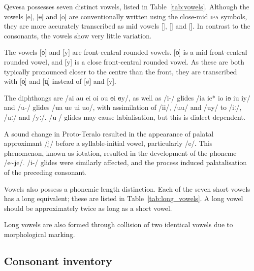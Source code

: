 \documentclass[grammar]{subfiles}
\begin{document}
  Qevesa possesses seven distinct vowels, listed in Table~\ref{tab:vowels}. Although the vowels [e], [ɵ] and [o] are conventionally written using the close-mid \textsc{ipa} symbols, they are more accurately transcribed as mid vowels [], [] and []. In contrast to the consonants, the vowels show very little variation.

  The vowels [ɵ] and [y] are front-central rounded vowels. [ɵ] is a mid front-central rounded vowel, and [y] is a close front-central rounded vowel. As these are both typically pronounced closer to the centre than the front, they are transcribed with [ɵ̟] and [ʉ̟] instead of [ø] and [y].

  The diphthongs are /ai au ei oi ou ɵi ɵy/, as well as /i-/ glides /ia ie* io iɵ iu iy/ and /u-/ glides /ua ue ui uo/, with assimilation of /ii/, /uu/ and /uy/ to /iː/, /uː/ and /yː/. /u-/ glides may cause labialisation, but this is dialect-dependent.  

  A sound change in Proto-Teralo resulted in the appearance of palatal approximant /j/ before a syllable-initial vowel, particularly /e/. This phenomenon, known as iotation, resulted in the development of the phoneme /\superj e\textasciitilde je/. /i-/ glides were similarly affected, and the process induced palatalisation of the preceding consonant.

  Vowels also possess a phonemic length distinction. Each of the seven short vowels has a long equivalent; these are listed in Table~\ref{tab:long_vowels}. A long vowel should be approximately twice as long as a short vowel.

  Long vowels are also formed through collision of two identical vowels due to morphological marking.

  \subsection{Consonant inventory}
  \label{ssec:consonants}
\end{document}
